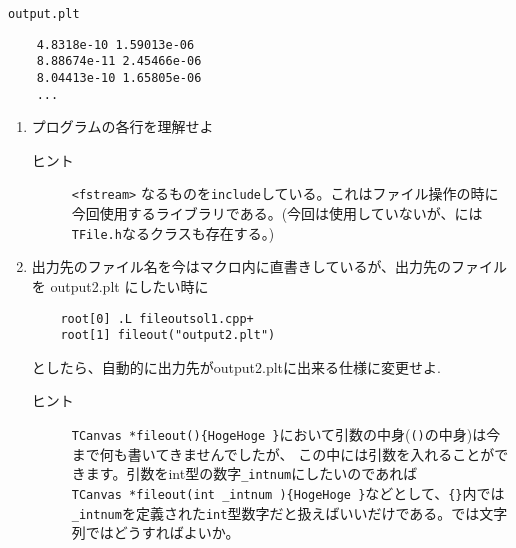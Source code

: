  \begin{itembox}{\texttt{output.plt}}
\begin{verbatim}
	4.8318e-10 1.59013e-06 
	8.88674e-11 2.45466e-06 
	8.04413e-10 1.65805e-06 
	...
\end{verbatim}
 \end{itembox}


 \begin{enumerate}
  \item プログラムの各行を理解せよ
	\begin{description}
	 \item[ヒント] \verb|<fstream>| なるものを\verb|include|している。これはファイル操作の時に今回使用するライブラリである。(今回は使用していないが、\ROOT には\verb|TFile.h|なるクラスも存在する。)
	\end{description}

  \item 出力先のファイル名を今はマクロ内に直書きしているが、出力先のファイルを output2.plt にしたい時に
\begin{verbatim}
	root[0] .L fileoutsol1.cpp+
	root[1] fileout("output2.plt") 
\end{verbatim}
	としたら、自動的に出力先がoutput2.pltに出来る仕様に変更せよ.
	\begin{description}
	 \item[ヒント]  \verb|TCanvas *fileout(){HogeHoge }|において引数の中身(\verb|()|の中身)は今まで何も書いてきませんでしたが、
		    この中には引数を入れることができます。引数をint型の数字\verb|_intnum|にしたいのであれば \\ \verb|TCanvas *fileout(int _intnum ){HogeHoge }|などとして、\verb|{}|内では\verb|_intnum|を定義された\verb|int|型数字だと扱えばいいだけである。では文字列ではどうすればよいか。

	\end{description}
 \end{enumerate}

